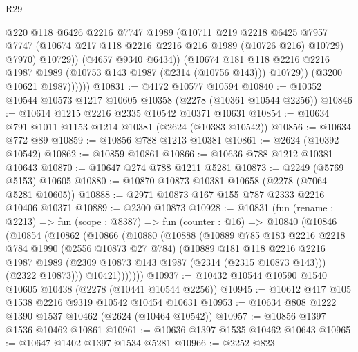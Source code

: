 \begin{lexlean}{R29}
\begin{coremodule}
                      @220
                      @118
                      @6426
                      @2216
                      @7747
                      @1989
                      (@10711
                        @219
                        @2218
                        @6425
                        @7957
                        @7747
                        (@10674 @217 @118 @2216 @2216 @216 @1989 (@10726 @216) @10729)
                        @7970)
                      @10729))
                  (@4657 @9340 @6434))
                (@10674
                  @181
                  @118
                  @2216
                  @2216
                  @1987
                  @1989
                  (@10753 @143 @1987 (@2314 (@10756 @143)))
                  @10729))
              (@3200 @10621 @1987))))))
@10831 := @4172 @10577 @10594
@10840 := @10352 @10544 @10573 @1217 @10605 @10358 (@2278 (@10361 @10544 @2256))
@10846 := @10614 @1215 @2216 @2335 @10542 @10371 @10631
@10854 := @10634 @791 @1011 @1153 @1214 @10381 (@2624 (@10383 @10542))
@10856 := @10634 @772 @89
@10859 := @10856 @788 @1213 @10381
@10861 := @2624 (@10392 @10542)
@10862 := @10859 @10861
@10866 := @10636 @788 @1212 @10381 @10643
@10870 := @10647 @274 @788 @1211 @5281
@10873 := @2249 (@5769 @5153) @10605
@10880 := @10870 @10873 @10381 @10658 (@2278 (@7064 @5281 @10605))
@10888 := @2971 @10873 @167 @155 @787 @2333 @2216 @10406 @10371
@10889 := @2300 @10873
@10928 := @10831
    (fun (rename : @2213) =>
    fun (scope : @8387) =>
    fun (counter : @16) =>
    @10840
      (@10846
        (@10854
          (@10862
            (@10866
              (@10880
                (@10888
                  (@10889
                    @785
                    @183
                    @2216
                    @2218
                    @784
                    @1990
                    (@2556 @10873 @27 @784)
                    (@10889
                      @181
                      @118
                      @2216
                      @2216
                      @1987
                      @1989
                      (@2309 @10873 @143 @1987 (@2314 (@2315 @10873 @143)))
                      (@2322 @10873)))
                  @10421)))))))
@10937 := @10432 @10544 @10590 @1540 @10605 @10438 (@2278 (@10441 @10544 @2256))
@10945 := @10612 @417 @105 @1538 @2216 @9319 @10542 @10454 @10631
@10953 := @10634 @808 @1222 @1390 @1537 @10462 (@2624 (@10464 @10542))
@10957 := @10856 @1397 @1536 @10462 @10861
@10961 := @10636 @1397 @1535 @10462 @10643
@10965 := @10647 @1402 @1397 @1534 @5281
@10966 := @2252 @823

\end{coremodule}
\end{lexlean}
